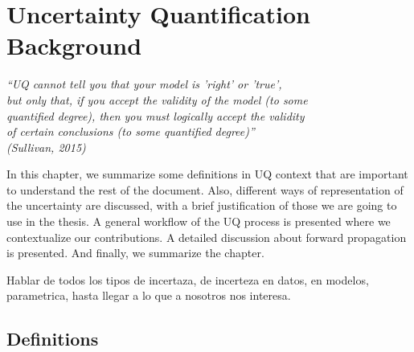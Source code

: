 

\chapter{Uncertainty Quantification Background}\label{cap:backgroud}


\begin{flushright}
	\textit{``UQ cannot tell you that your model is 'right' or 'true', \\
	but only that, if you accept the validity of the model (to some \\
	quantified degree), then you must logically accept the validity\\
	of certain conclusions (to some quantified degree)''\\
	(Sullivan, 2015)}
\end{flushright}

In this chapter, we summarize some definitions in UQ context that are important to understand the rest of the document. Also, different ways of representation of the uncertainty are discussed, with a brief justification of those we are going to use in the thesis. A general workflow of the UQ process is presented where we contextualize our contributions. A detailed discussion about forward propagation is presented. And finally, we summarize the chapter.

Hablar de todos los tipos de incertaza, de incerteza en datos, en modelos, parametrica, hasta llegar a lo que a nosotros nos interesa.

\section{Definitions}
